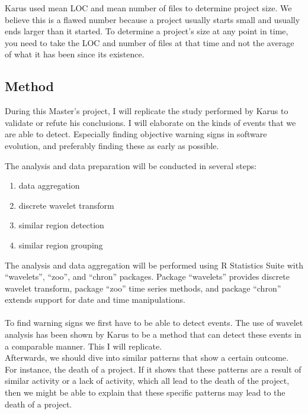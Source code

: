 Karus used mean LOC and mean number of files to determine project size. We
believe this is a flawed number because a project usually starts small and
usually ends larger than it started. To determine a project's size at any point
in time, you need to take the LOC and number of files at that time and not the
average of what it has been since its existence.

\subsection{Method}
During this Master's project, I will replicate the study performed by Karus to
validate or refute his conclusions. I will elaborate on the kinds of events
that we are able to detect. Especially finding objective warning signs in
software evolution, and preferably finding these as early as possible.

The analysis and data preparation will be conducted in several steps:
\begin{enumerate}
	\item data aggregation
	\item discrete wavelet transform
	\item similar region detection
	\item similar region grouping
\end{enumerate}
The analysis and data aggregation will be performed using R Statistics Suite
with ``wavelets'', ``zoo'', and ``chron'' packages. Package ``wavelets''
provides discrete wavelet transform, package ``zoo'' time series methods, and
package ``chron'' extends support for date and time manipulations.

\paragraph{}
To find warning signs we first have to be able to detect events. The use
of wavelet analysis has been shown by Karus \cite{karus2013} to be a method
that can detect these events in a comparable manner. This I will replicate.
\\

Afterwards, we should dive into similar patterns that show a certain outcome.
For instance, the death of a project. If it shows that these patterns are a
result of similar activity or a lack of activity, which all lead to the death of
the project, then we might be able to explain that these specific patterns may
lead to the death of a project.
\\

